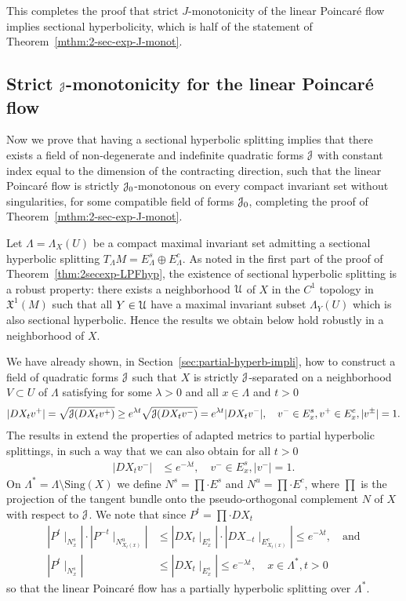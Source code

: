 \documentclass[12pt,reqno]{amsart}
\numberwithin{equation}{section}
\theoremstyle{plain}
\theoremstyle{definition}
\newcommand{\sing}{\mathrm{Sing}}
\newcommand{\U}{\EuScript{U}}
\newcommand{\J}{\EuScript{J}}
\newcommand{\Mundo}{\mathfrak{X}^{1}(M)}
\begin{document}
This completes the proof that strict $J$-monotonicity of the
linear Poincar\'e flow implies sectional hyperbolicity,
which is half of the statement of
Theorem~\ref{mthm:2-sec-exp-J-monot}.

\subsection{ Strict $\J$-monotonicity for
  the linear Poincar\'e flow}
\label{sec:hyperb-linear-poinca}

Now we prove that having a sectional hyperbolic splitting
implies that there exists a field of non-degenerate and
indefinite quadratic forms $\J$ with constant index equal to the
dimension of the contracting direction, such that the linear
Poincar\'e flow is strictly $\J_0$-monotonous on every
compact invariant set without singularities, for some
compatible field of forms $\J_0$, completing the proof of
Theorem~\ref{mthm:2-sec-exp-J-monot}.

Let $\Lambda=\Lambda_X(U)$ be a compact maximal invariant
set admitting a sectional hyperbolic splitting $T_\Lambda
M=E^s_\Lambda \oplus E^c_\Lambda$. As noted in the first
part of the proof of Theorem~\ref{thm:2secexp-LPFhyp}, the
existence of sectional hyperbolic splitting is a robust
property: there exists a neighborhood $\U$ of $X$ in the
$C^1$ topology in $\Mundo$ such that all $Y\in\U$ have a
maximal invariant subset $\Lambda_Y(U)$ which is also
sectional hyperbolic. Hence the results we obtain below hold
robustly in a neighborhood of $X$.

We have already shown, in
Section~\ref{sec:partial-hyperb-impli}, how to construct a
field of quadratic forms $\J$ such that $X$ is strictly
$\J$-separated on a neighborhood $V\subset U$ of $\Lambda$
satisfying for some $\lambda>0$ and all $x\in\Lambda$ and
$t>0$
\begin{align*}
  |DX_tv^+|=\sqrt{ \J(DX_tv^+)}\ge e^{\lambda t}
  \sqrt{\J(DX_tv^-)} = e^{\lambda t}|DX_tv^-|, \quad v^-\in
  E^s_x, v^+\in E^c_x, |v^\pm|=1.
\end{align*}
The results in \cite{Goum07} extend the properties of
adapted metrics to partial hyperbolic splittings, in such a
way that we can also obtain for all $t>0$
\begin{align*}
  |DX_tv^-|&\le e^{-\lambda t}, \quad v^-\in E^s_x, |v^-|=1.
\end{align*}
On $\Lambda^*=\Lambda\setminus \sing(X)$ we define
$N^s=\prod\cdot E^s$ and $N^u=\prod\cdot E^c$, where $\prod$
is the projection of the tangent bundle onto the
pseudo-orthogonal complement $N$ of $X$ with respect to
$\J$. We note that since $P^t=\prod\cdot DX_t$
\begin{align}
  |P^t\mid_{N^s_x}|\cdot|P^{-t}\mid_{N^u_{X_t(x)}}|
  &\le
  |DX_t\mid_{E^s_x}|\cdot|DX_{-t}\mid_{E^c_{X_t(x)}}|
  \le
  e^{-\lambda t},
  \quad\text{and} \label{eq:FLP-domin}
  \\
  |P^t\mid_{N^s_x}|
  &\le \label{eq:FLPs-contr}
  |DX_t\mid_{E^s_x}|
  \le  e^{-\lambda t},\quad
  x\in\Lambda^*, t>0
\end{align}
so that the linear Poincar\'e flow has a partially hyperbolic
splitting over $\Lambda^*$.
\end{document}

